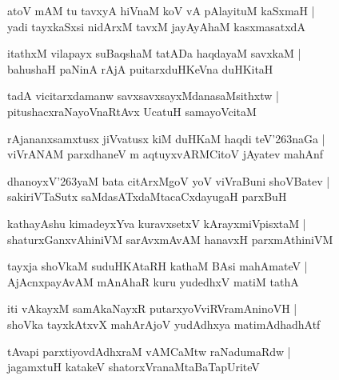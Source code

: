 \documentclass[twoside,12pt,openright]{book}
\def\S{\char'263}
\newcounter{shloka}[chapter]
\begin{document}
\begin{shloka}%
atoV mAM tu tavxyA hiVnaM koV vA pAlayituM kaSxmaH |\\
yadi tayxkaSxsi nidArxM tavxM jayAyAhaM kasxmasatxdA
\end{shloka}

\begin{shloka}%
itathxM vilapayx suBaqshaM tatADa haqdayaM savxkaM |\\
bahushaH paNinA rAjA puitarxduHKeVna duHKitaH
\end{shloka}

\begin{shloka}%
tadA vicitarxdamanw savxsavxsayxMdanasaMsithxtw |\\
pitushacxraNayoVnaRtAvx UcatuH samayoVcitaM 
\end{shloka}

\begin{shloka}%
rAjananxsamxtusx jiVvatusx kiM duHKaM haqdi teV\S naGa |\\
viVrANAM parxdhaneV m aqtuyxvARMCitoV jAyatev mahAnf
\end{shloka}

\begin{shloka}%
dhanoyxV\S yaM bata citArxMgoV yoV viVraBuni shoVBatev |\\
sakiriVTaSutx saMdasATxdaMtacaCxdayugaH parxBuH 
\end{shloka}

\begin{shloka}%
kathayAshu kimadeyxYva kuravxsetxV kArayxmiVpisxtaM |\\
shaturxGanxvAhiniVM sarAvxmAvAM hanavxH parxmAthiniVM 
\end{shloka}

\begin{shloka}%
tayxja shoVkaM suduHKAtaRH kathaM BAsi mahAmateV |\\
AjAcnxpayAvAM mAnAhaR kuru yudedhxV matiM tathA 
\end{shloka}

\begin{shloka}%
iti vAkayxM samAkaNayxR putarxyoVviRVramAninoVH |\\
shoVka tayxkAtxvX mahArAjoV yudAdhxya matimAdhadhAtf 
\end{shloka}

\begin{shloka}%
tAvapi parxtiyovdAdhxraM vAMCaMtw raNadumaRdw |\\
jagamxtuH katakeV shatorxVranaMtaBaTapUriteV
\end{shloka}
\end{document}
